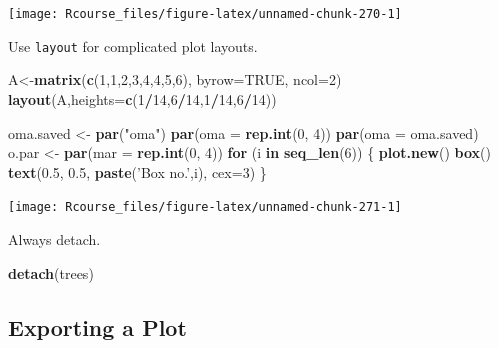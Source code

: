 \documentclass[]{book}
\newenvironment{Shaded}{\begin{snugshade}}{\end{snugshade}}
\newcommand{\KeywordTok}[1]{\textcolor[rgb]{0.13,0.29,0.53}{\textbf{#1}}}
\newcommand{\DataTypeTok}[1]{\textcolor[rgb]{0.13,0.29,0.53}{#1}}
\newcommand{\DecValTok}[1]{\textcolor[rgb]{0.00,0.00,0.81}{#1}}
\newcommand{\FloatTok}[1]{\textcolor[rgb]{0.00,0.00,0.81}{#1}}
\newcommand{\StringTok}[1]{\textcolor[rgb]{0.31,0.60,0.02}{#1}}
\newcommand{\OtherTok}[1]{\textcolor[rgb]{0.56,0.35,0.01}{#1}}
\newcommand{\ControlFlowTok}[1]{\textcolor[rgb]{0.13,0.29,0.53}{\textbf{#1}}}
\newcommand{\OperatorTok}[1]{\textcolor[rgb]{0.81,0.36,0.00}{\textbf{#1}}}
\newcommand{\NormalTok}[1]{#1}
\theoremstyle{definition}
\theoremstyle{definition}
\theoremstyle{definition}
\theoremstyle{remark}
\begin{document}
\texttt{[image: Rcourse\_files/figure-latex/unnamed-chunk-270-1]}

Use \texttt{layout} for complicated plot layouts.

\begin{Shaded}
\begin{Highlighting}[]
\NormalTok{A<-}\KeywordTok{matrix}\NormalTok{(}\KeywordTok{c}\NormalTok{(}\DecValTok{1}\NormalTok{,}\DecValTok{1}\NormalTok{,}\DecValTok{2}\NormalTok{,}\DecValTok{3}\NormalTok{,}\DecValTok{4}\NormalTok{,}\DecValTok{4}\NormalTok{,}\DecValTok{5}\NormalTok{,}\DecValTok{6}\NormalTok{), }\DataTypeTok{byrow=}\OtherTok{TRUE}\NormalTok{, }\DataTypeTok{ncol=}\DecValTok{2}\NormalTok{)}
\KeywordTok{layout}\NormalTok{(A,}\DataTypeTok{heights=}\KeywordTok{c}\NormalTok{(}\DecValTok{1}\OperatorTok{/}\DecValTok{14}\NormalTok{,}\DecValTok{6}\OperatorTok{/}\DecValTok{14}\NormalTok{,}\DecValTok{1}\OperatorTok{/}\DecValTok{14}\NormalTok{,}\DecValTok{6}\OperatorTok{/}\DecValTok{14}\NormalTok{))}

\NormalTok{oma.saved <-}\StringTok{ }\KeywordTok{par}\NormalTok{(}\StringTok{"oma"}\NormalTok{)}
\KeywordTok{par}\NormalTok{(}\DataTypeTok{oma =} \KeywordTok{rep.int}\NormalTok{(}\DecValTok{0}\NormalTok{, }\DecValTok{4}\NormalTok{))}
\KeywordTok{par}\NormalTok{(}\DataTypeTok{oma =}\NormalTok{ oma.saved)}
\NormalTok{o.par <-}\StringTok{ }\KeywordTok{par}\NormalTok{(}\DataTypeTok{mar =} \KeywordTok{rep.int}\NormalTok{(}\DecValTok{0}\NormalTok{, }\DecValTok{4}\NormalTok{))}
\ControlFlowTok{for}\NormalTok{ (i }\ControlFlowTok{in} \KeywordTok{seq_len}\NormalTok{(}\DecValTok{6}\NormalTok{)) \{}
    \KeywordTok{plot.new}\NormalTok{()}
    \KeywordTok{box}\NormalTok{()}
    \KeywordTok{text}\NormalTok{(}\FloatTok{0.5}\NormalTok{, }\FloatTok{0.5}\NormalTok{, }\KeywordTok{paste}\NormalTok{(}\StringTok{'Box no.'}\NormalTok{,i), }\DataTypeTok{cex=}\DecValTok{3}\NormalTok{)}
\NormalTok{\}}
\end{Highlighting}
\end{Shaded}

\texttt{[image: Rcourse\_files/figure-latex/unnamed-chunk-271-1]}

Always detach.

\begin{Shaded}
\begin{Highlighting}[]
\KeywordTok{detach}\NormalTok{(trees)}
\end{Highlighting}
\end{Shaded}

\subsection{Exporting a Plot}\label{exporting-a-plot}
\end{document}

